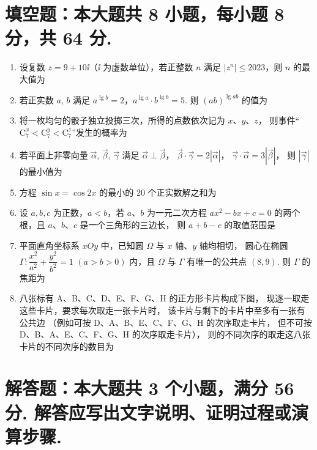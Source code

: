 \documentclass{chsmc}
\begin{document}
\section{填空题：本大题共 8 小题，每小题 8 分，共 64 分.}

\begin{enumerate}
  \item 设复数 $z = 9 + 10\ii$（$\ii$ 为虚数单位），若正整数 $n$ 满足
    $|z^n| \leqslant 2023$，则 $n$ 的最大值为 \blankline
  \item 若正实数 $a$, $b$ 满足 $a^{\lg b} = 2$，$a^{\lg a}\cdot b^{\lg b} = 5$.
    则 $(ab)^{\lg ab}$ 的值为 \blankline
  \item 将一枚均匀的骰子独立投掷三次，所得的点数依次记为 $x$、$y$、$z$，
    则事件“$\mathrm{C}_7^x < \mathrm{C}_7^y < \mathrm{C}_7^z$”发生的概率为 \blankline
  \item 若平面上非零向量 $\vec{\alpha}$, $\vec{\beta}$, $\vec{\gamma}$ 满足
    $\vec{\alpha} \perp \vec{\beta}$，
    $\vec{\beta}\cdot\vec{\gamma} = 2|\vec{\alpha}|$，
    $\vec{\gamma}\cdot\vec{\alpha} = 3|\vec{\beta}|$，
    则 $|\vec{\gamma}|$ 的最小值为 \blankline
  \item 方程 $\sin x = \cos 2x$ 的最小的 $20$ 个正实数解之和为 \blankline
  \item 设 $a, b, c$ 为正数，$a < b$，若 $a$、$b$ 为一元二次方程
    $ax^2 - bx + c = 0$ 的两个根，且 $a$、$b$、$c$ 是一个三角形的三边长，
    则 $a + b - c$ 的取值范围是 \blankline
  \item 平面直角坐标系 $xOy$ 中，已知圆 $\Omega$ 与 $x$ 轴、$y$ 轴均相切，
    圆心在椭圆 $\Gamma\colon \dfrac{x^2}{a^2} + \dfrac{y^2}{b^2} = 1$
    $(a > b > 0)$ 内，且 $\Omega$ 与 $\Gamma$ 有唯一的公共点 $(8,9)$.
    则 $\Gamma$ 的焦距为 \blankline
  \item 八张标有 A、B、C、D、E、F、G、H 的正方形卡片构成下图，
    现逐一取走这些卡片，要求每次取走一张卡片时，
    该卡片与剩下的卡片中至多有一张有公共边
    （例如可按 D、A、B、E、C、F、G、H 的次序取走卡片，
    但不可按 D、B、A、E、C、F、G、H 的次序取走卡片），
    则的不同次序的取走这八张卡片的不同次序的数目为 \blankline
\end{enumerate}

\section{解答题：本大题共 3 个小题，满分 56 分. 解答应写出文字说明、证明过程或演算步骤.}
\end{document}

